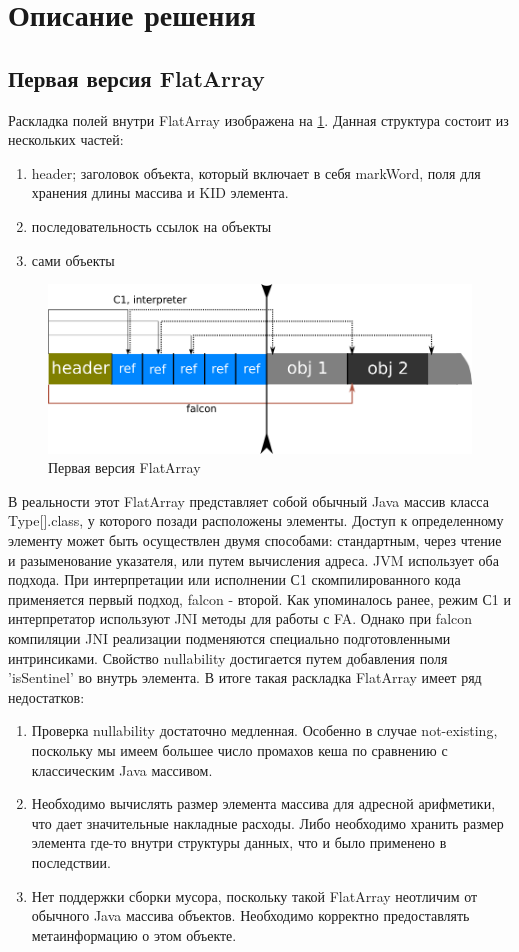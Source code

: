 \section{Описание решения} \label{label-description}
\subsection{Первая версия FlatArray}
Раскладка полей внутри FlatArray изображена на \ref{first-fa}.
Данная структура состоит из нескольких частей:
\begin{enumerate}
	\item header; заголовок объекта, который включает в себя markWord, поля для хранения длины массива и KID элемента.
	\item последовательность ссылок на объекты
	\item сами объекты
\end{enumerate}
\begin{figure}[h]
	\includegraphics[width=0.95\linewidth]{image/flatarray.png}
	\caption{Первая версия FlatArray}\label{first-fa}
\end{figure}
В реальности этот FlatArray представляет собой обычный Java массив класса Type[].class, у которого позади расположены элементы. Доступ к определенному элементу может быть осуществлен двумя способами: стандартным, через чтение и разыменование указателя, или путем вычисления адреса. 
JVM использует оба подхода. При интерпретации или исполнении С1 скомпилированного кода применяется первый подход, falcon - второй. 
Как упоминалось ранее, режим С1 и интерпретатор используют JNI методы для работы с FA. Однако при falcon компиляции JNI реализации подменяются специально подготовленными интринсиками. 
Свойство nullability достигается путем добавления поля 'isSentinel' во внутрь элемента. 
В итоге такая раскладка FlatArray имеет ряд недостатков:
\begin{enumerate}
	\item Проверка nullability достаточно медленная. Особенно в случае not-existing, поскольку мы имеем большее число промахов кеша по сравнению с классическим Java массивом.
	\item Необходимо вычислять размер элемента массива для адресной арифметики, что дает значительные накладные расходы. Либо необходимо хранить размер элемента где-то внутри структуры данных, что и было применено в последствии.
	\item Нет поддержки сборки мусора, поскольку такой FlatArray неотличим от обычного Java массива объектов. 
	Необходимо корректно предоставлять метаинформацию о этом объекте. 
\end{enumerate}

